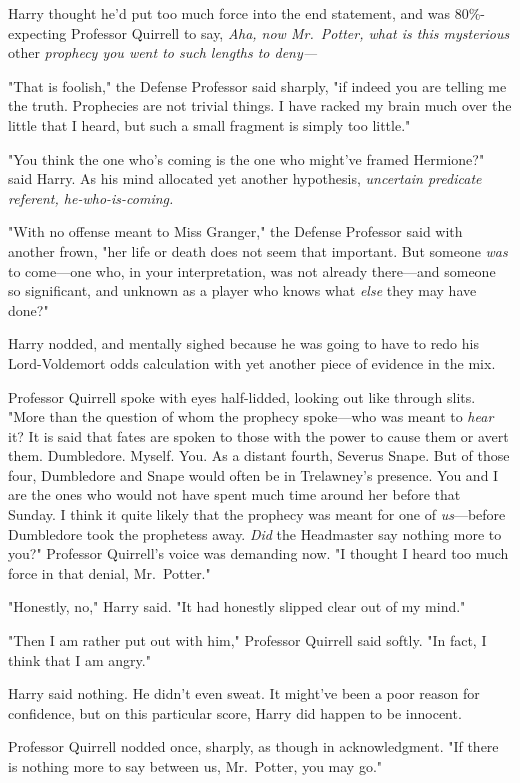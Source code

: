 Harry thought he'd put too much force into the end statement, and was
80\%-expecting Professor Quirrell to say, \emph{Aha, now Mr.~Potter, what is
this mysterious} other \emph{prophecy you went to such lengths to deny---}

"That is foolish," the Defense Professor said sharply, "if indeed you are
telling me the truth. Prophecies are not trivial things. I have racked my brain
much over the little that I heard, but such a small fragment is simply too
little."

"You think the one who's coming is the one who might've framed Hermione?" said
Harry. As his mind allocated yet another hypothesis, \emph{uncertain predicate
referent, he-who-is-coming.}

"With no offense meant to Miss Granger," the Defense Professor said with
another frown, "her life or death does not seem that important. But someone
\emph{was} to come---one who, in your interpretation, was not already
there---and someone so significant, and unknown as a player{\el} who knows
what \emph{else} they may have done?"

Harry nodded, and mentally sighed because he was going to have to redo his
Lord-Voldemort odds calculation with yet another piece of evidence in the mix.

Professor Quirrell spoke with eyes half-lidded, looking out like through slits.
"More than the question of whom the prophecy spoke---who was meant to
\emph{hear} it? It is said that fates are spoken to those with the power to
cause them or avert them. Dumbledore. Myself. You. As a distant fourth, Severus
Snape. But of those four, Dumbledore and Snape would often be in Trelawney's
presence. You and I are the ones who would not have spent much time around her
before that Sunday. I think it quite likely that the prophecy was meant for one
of \emph{us}---before Dumbledore took the prophetess away. \emph{Did} the
Headmaster say nothing more to you?" Professor Quirrell's voice was demanding
now. "I thought I heard too much force in that denial, Mr.~Potter."

"Honestly, no," Harry said. "It had honestly slipped clear out of my mind."

"Then I am rather put out with him," Professor Quirrell said softly. "In fact,
I think that I am angry."

Harry said nothing. He didn't even sweat. It might've been a poor reason for
confidence, but on this particular score, Harry did happen to be innocent.

Professor Quirrell nodded once, sharply, as though in acknowledgment. "If there
is nothing more to say between us, Mr.~Potter, you may go."

